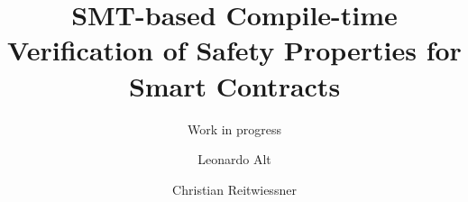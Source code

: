 \documentclass{llncs}
\begin{document}
\pagestyle{plain}

\title{SMT-based Compile-time Verification of Safety Properties for Smart Contracts}
\subtitle{Work in progress}

\author{Leonardo Alt \and Christian Reitwiessner}
\maketitle










\end{document}
